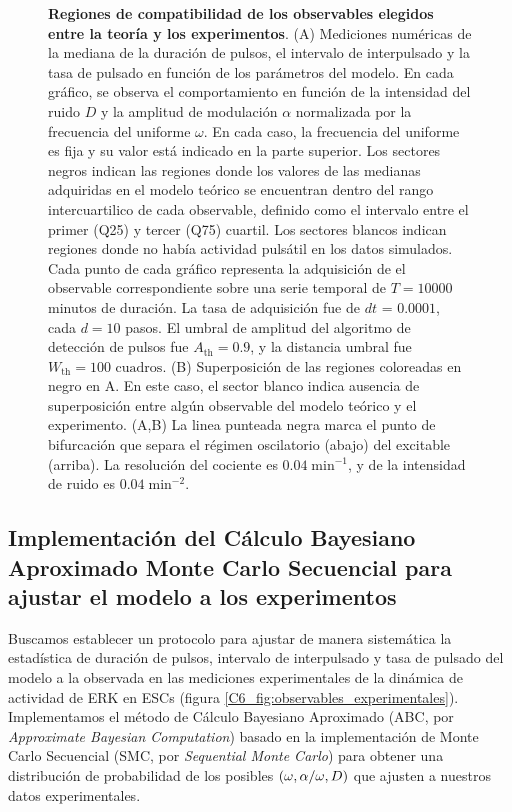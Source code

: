 \documentclass[./main.tex]{subfiles}
\begin{document}
\begin{figure}
    \caption{\textbf{Regiones de compatibilidad de los observables elegidos entre la teoría y los experimentos}. (A) Mediciones numéricas de la mediana de la duración de pulsos, el intervalo de interpulsado y la tasa de pulsado en función de los parámetros del modelo. En cada gráfico, se observa el comportamiento en función de la intensidad del ruido $D$ y la amplitud de modulación $\alpha$ normalizada por la frecuencia del uniforme $\omega$. En cada caso, la frecuencia del uniforme es fija y su valor está indicado en la parte superior. Los sectores negros indican las regiones donde los valores de las medianas adquiridas en el modelo teórico se encuentran dentro del rango intercuartilico de cada observable, definido como el intervalo entre el primer (Q25) y tercer (Q75) cuartil. Los sectores blancos indican regiones donde no había actividad pulsátil en los datos simulados. Cada punto de cada gráfico representa la adquisición de el observable correspondiente sobre una serie temporal de $T = 10000$ minutos de duración. La tasa de adquisición fue de $dt$ = $0.0001$, cada $d = 10$ pasos. El umbral de amplitud del algoritmo de detección de pulsos fue $A_{\text{th}} = 0.9$, y la distancia umbral fue $W_{\text{th}} = 100\text{ cuadros}$. (B) Superposición de las regiones coloreadas en negro en A. En este caso, el sector blanco indica ausencia de superposición entre algún observable del modelo teórico y el experimento. (A,B) La linea punteada negra marca el punto de bifurcación que separa el régimen oscilatorio (abajo) del excitable (arriba). La resolución del cociente \dddelta es $0.04\; \text{min}^{-1}$, y de la intensidad de ruido es $0.04\; \text{min}^{-2}$.}
    \label{C6_fig:2d_plots_sup}
\end{figure}




\subsection{Implementación del Cálculo Bayesiano Aproximado Monte Carlo Secuencial para ajustar el modelo a los experimentos}
\label{C6_sssec:implementac_ABCSMC}

Buscamos establecer un protocolo para ajustar de manera sistemática la estadística de duración de pulsos, intervalo de interpulsado y tasa de pulsado del modelo a la observada en las mediciones experimentales de la dinámica de actividad de ERK en ESCs (figura \ref{C6_fig:observables_experimentales}). Implementamos el método de Cálculo Bayesiano Aproximado (ABC, por \textit{Approximate Bayesian Computation}) basado en la implementación de Monte Carlo Secuencial (SMC, por \textit{Sequential Monte Carlo}) para obtener una distribución de probabilidad de los posibles $(\omega,\alpha/\omega,D)$ que ajusten a nuestros datos experimentales.
\end{document}
